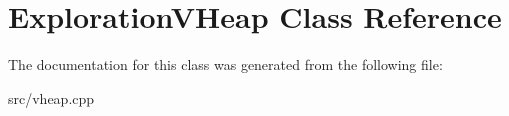 \hypertarget{class_exploration_v_heap}{\section{Exploration\-V\-Heap Class Reference}
\label{class_exploration_v_heap}
}


The documentation for this class was generated from the following file\-:\begin{DoxyCompactItemize}
\item 
src/vheap.\-cpp\end{DoxyCompactItemize}
